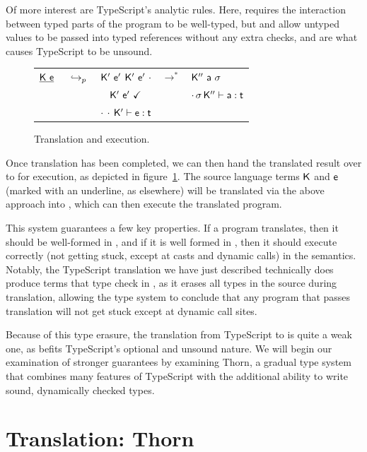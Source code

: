 \documentclass[a4paper,USenglish]{tex/lipics-v2016}
\begin{document}
Of more interest are TypeScript's analytic rules. Here, 
requires the interaction between typed parts of the program to be well-typed,
but  and  allow untyped values to be passed
into typed references without any extra checks, and are what causes TypeScript
to be unsound.

\begin{figure}[!h]
\Large
\begin{tabular}{rcccl}
$\underline{{\sf{K}}~{\sf{e}}}$ & $\underline{} ~\hookrightarrow_p~$ & ${{\sf{K'}}}~{{{\sf{e'}}}}$ ${{\sf{K'}}}~{{{\sf{e'}}}}~\cdot$ & $\longrightarrow^*$ & ${{\sf{K''}}}~{\sf{a}}~\sigma$ \\
&& ${{\sf{K'}}}~{{{\sf{e'}}}}~\checkmark$ & & 
$\EnvType {\cdot}{\s}\Kpp\a\t$ \\
& & $\EnvType {\cdot}{\cdot}\Kp\e\t$ && \\ 
\end{tabular}
\caption{\kafka Translation and execution.}\label{redu}
\end{figure}

Once translation has been completed, we can then hand the translated result over
to \kafka for execution, as depicted in figure~\ref{redu}. The source language
terms ${\sf{K}}$ and ${\sf{e}}$ (marked with an underline, as elsewhere) will be translated
via the above approach into \kafka, which can then execute the translated 
program.

This system guarantees a few key properties. If a program translates, then it 
should be well-formed in \kafka, and if it is well formed in \kafka, then it
should execute correctly (not getting stuck, except at casts and dynamic calls) 
in the \kafka semantics. Notably, the TypeScript translation we have just 
described technically does produce terms that type check in \kafka, as it erases
all types in the source during translation, allowing the \kafka type system to
conclude that any program that passes translation will not get stuck except
at dynamic call sites.

Because of this type erasure, the translation from TypeScript to \kafka is quite
a weak one, as befits TypeScript's optional and unsound nature. We will begin our
examination of stronger guarantees by examining Thorn, a gradual type system that
combines many features of TypeScript with the additional ability to write sound,
dynamically checked types.

\section{Translation: Thorn}
\newcommand{\bC}{\xt{!C}}
\end{document}
